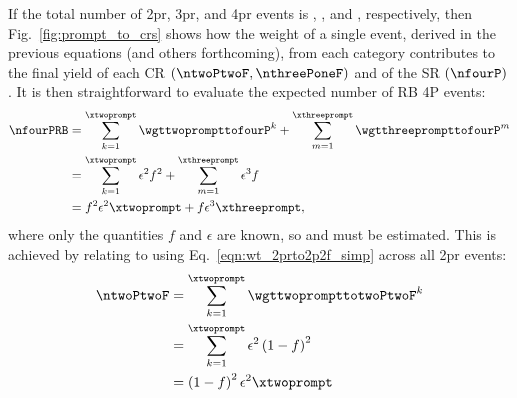 If the total number of 2pr, 3pr, and 4pr events is \xtwoprompt, \xthreeprompt, and \xfourprompt, respectively, then Fig.~\ref{fig:prompt_to_crs} shows how the weight of a single event, derived in the previous equations (and others forthcoming), from each category contributes to the final yield of each CR $\left( \ntwoPtwoF, \nthreePoneF \right)$ and of the SR $\left( \nfourP \right)$.
It is then straightforward to evaluate the expected number of RB 4P events:
\begin{align}
	\label{eqn:n4p_x2x3}
	\nfourPRB
	&= \sum_{k=1}^{\xtwoprompt} \wgttwoprompttofourP^k + \sum_{m=1}^{\xthreeprompt} \wgtthreeprompttofourP^m
	\notag
	\\
	&= \sum_{k=1}^{\xtwoprompt} \epsilon^2 f^2 + \sum_{m=1}^{\xthreeprompt} \epsilon^3 f
	\notag
	\\
	&= f^2 \epsilon^2 \xtwoprompt + f \epsilon^3 \xthreeprompt,
\end{align}
where only the quantities $f$ and $\epsilon$ are known, so \xtwoprompt and \xthreeprompt must be estimated.
This is achieved by relating \xtwoprompt to \ntwoPtwoF using Eq.~\ref{eqn:wt_2prto2p2f_simp} across all 2pr events:
\begin{align}
	\label{eqn:n2p2f_x2}
	\ntwoPtwoF
	&= \sum_{k=1}^{\xtwoprompt} \wgttwoprompttotwoPtwoF^k
	\notag
	\\
	&= \sum_{k=1}^{\xtwoprompt} \epsilon^2 \left( 1-f \right)^2
	\notag
	\\
	&= \left( 1-f \right)^2 \epsilon^2 \xtwoprompt
\end{align}

